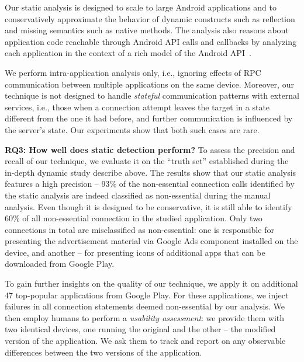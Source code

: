 
Our static analysis is designed to scale to large Android applications
and to conservatively approximate the behavior of dynamic constructs
such as reflection and missing semantics such as native methods.  The
analysis also reasons about application code reachable through Android
API calls and callbacks by analyzing each application in the context
of a rich model of the Android
API~\cite{Gordon:Kim:Perkins:Gilham:Nguyen:Rinard:NDSS15}. 

We perform intra-application analysis only, i.e., ignoring effects of RPC communication between multiple applications on the same device. Moreover, our technique is not designed to handle
\emph{stateful} communication patterns with external services, i.e., those when a connection attempt leaves the target in a state different from the one it had before, and further communication is influenced by the server's state. Our experiments show that both such cases are rare. 

\noindent 
{\bf RQ3: How well does static detection perform?}
To assess the precision and recall of our technique, we evaluate it on the ``truth set'' established during the in-depth dynamic study describe above. %
The results show that our static analysis features a high precision -- 93\% of the non-essential connection calls identified by the static analysis are indeed classified as non-essential during the manual analysis. Even though it is designed to be conservative, it is still able to identify 60\% of all non-essential connection in the studied application.
Only two connections in total are misclassified as non-essential: one is responsible for presenting the advertisement material via Google Ads component installed on the device, and another -- for presenting icons of additional apps that can be downloaded from Google Play. 

To gain further insights on the quality of our technique, we apply it on additional 47 top-popular applications from Google Play. For these applications, we inject failures in all connection statements deemed non-essential by our analysis. We then employ humans to perform a \emph{usability assessment}: we provide them with two identical devices, one running the original and the other -- the modified version of the application. We ask them to track and report on any observable differences between the two versions of the application. 


